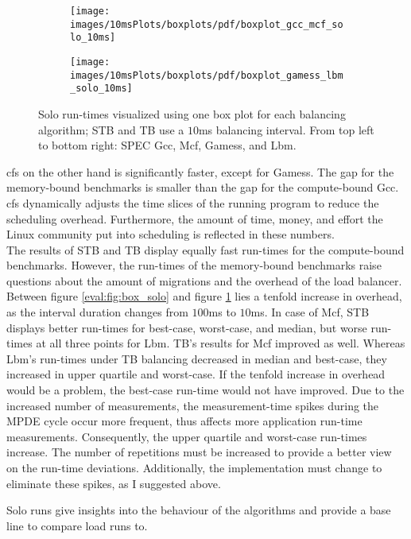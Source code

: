 \begin{figure}[!ht]
  \begin{subfigure}{\textwidth}
  \texttt{[image: images/10msPlots/boxplots/pdf/boxplot\_gcc\_mcf\_solo\_10ms]}
  \end{subfigure}
  \begin{subfigure}{\textwidth}
  \texttt{[image: images/10msPlots/boxplots/pdf/boxplot\_gamess\_lbm\_solo\_10ms]}
  \end{subfigure}
  \caption{Solo run-times visualized using one box plot for each balancing
    algorithm; STB and TB use a $10$ms balancing interval.
    From top left to bottom right: SPEC Gcc, Mcf, Gamess, and Lbm.}
  \label{eval:fig:box_solo_10ms}
\end{figure}


\Gls{cfs} on the other hand is significantly faster, except for Gamess.
The gap for the memory-bound benchmarks is smaller than the gap for
the compute-bound Gcc.
\Gls{cfs} dynamically adjusts the time slices of the running program to reduce
the scheduling overhead.
Furthermore, the amount of time, money, and effort the Linux community put into
scheduling is reflected in these numbers.
\\

The results of STB and TB display equally fast run-times for the compute-bound
benchmarks.
However, the run-times of the memory-bound benchmarks raise questions about the
amount of migrations and the overhead of the load balancer.
Between figure \ref{eval:fig:box_solo} and figure \ref{eval:fig:box_solo_10ms}
lies a tenfold increase in overhead, as the interval duration changes from
$100$ms to $10$ms.
In case of Mcf, STB displays better run-times for best-case, worst-case, and
median, but worse run-times at all three points for Lbm.
TB's results for Mcf improved as well.
Whereas Lbm's run-times under TB balancing decreased in median and best-case,
they increased in upper quartile and worst-case.
If the tenfold increase in overhead would be a problem, the best-case run-time
would not have improved.
Due to the increased number of measurements, the measurement-time spikes during
the MPDE cycle occur more frequent, thus affects more application run-time
measurements.
Consequently, the upper quartile and worst-case run-times increase.
The number of repetitions must be increased to provide a better view on the
run-time deviations.
Additionally, the implementation must change to eliminate these spikes, as I
suggested above.

Solo runs give insights into the behaviour of the algorithms and provide
a base line to compare load runs to.


